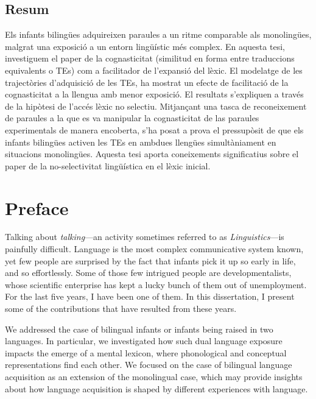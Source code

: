\documentclass[
  12pt,
  b5paperpaper,
  twoside]{scrreprt}
\newcommand\blankpage{%
    \null
    \thispagestyle{empty}%
    \addtocounter{page}{-1}%
    \newpage
}
\begin{document}
\begin{spacing}{1.5}

\clearpage
\section*{\sffamily Resum}
\normalsize{Els infants bilingües adquireixen paraules a un ritme
comparable als monolingües, malgrat una exposició a un entorn lingüístic
més complex. En aquesta tesi, investiguem el paper de la cognasticitat
(similitud en forma entre traduccions equivalents o TEs) com a
facilitador de l'expansió del lèxic. El modelatge de les trajectòries
d'adquisició de les TEs, ha mostrat un efecte de facilitació de la
cognasticitat a la llengua amb menor exposició. El resultats s'expliquen
a través de la hipòtesi de l'accés lèxic no selectiu. Mitjançant una
tasca de reconeixement de paraules a la que es va manipular la
cognasticitat de las paraules experimentals de manera encoberta, s'ha
posat a prova el pressupòsit de que els infants bilingües activen les
TEs en ambdues llengües simultàniament en situacions monolingües.
Aquesta tesi aporta coneixements significatius sobre el paper de la
no-selectivitat lingüística en el lèxic inicial.}
\afterpage{\blankpage}
\clearpage



\clearpage
\chapter*{\sffamily Preface}
\vspace*{\baselineskip}
\normalsize{Talking about \emph{talking}---an activity sometimes
referred to as \emph{Linguistics}---is painfully difficult. Language is
the most complex communicative system known, yet few people are
surprised by the fact that infants pick it up so early in life, and so
effortlessly. Some of those few intrigued people are developmentalists,
whose scientific enterprise has kept a lucky bunch of them out of
unemployment. For the last five years, I have been one of them. In this
dissertation, I present some of the contributions that have resulted
from these years.

We addressed the case of bilingual infants or infants being raised in
two languages. In particular, we investigated how such dual language
exposure impacts the emerge of a mental lexicon, where phonological and
conceptual representations find each other. We focused on the case of
bilingual language acquisition as an extension of the monolingual case,
which may provide insights about how language acquisition is shaped by
different experiences with language.

}
\end{spacing}
\end{document}
